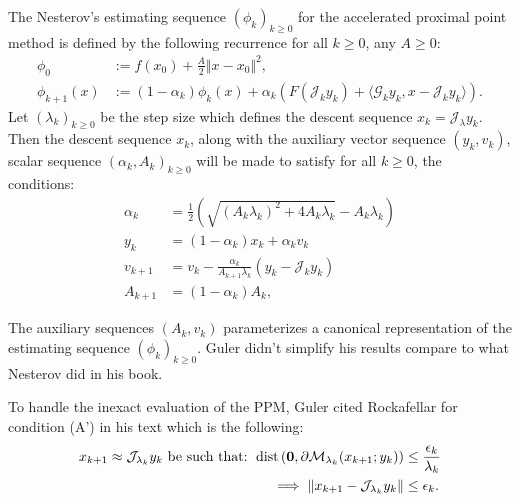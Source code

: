 \documentclass[12pt]{article}
\begin{document}
    \begin{definition}\label{def:nes-est-seq-acc-ppm}
        The Nesterov's estimating sequence $(\phi_k)_{k \ge0}$ for the accelerated proximal point method is defined by the following recurrence for all $k \ge0$, any $A \ge 0$: 
        \begin{align*}
            \phi_0 &:= f(x_0) + \frac{A}{2}\Vert x - x_0\Vert^2, 
            \\
            \phi_{k + 1}(x) &:= 
            (1 - \alpha_k)\phi_k(x)
            + 
            \alpha_k(F(\mathcal J_k y_k) + \langle \mathcal G_k y_k, x - \mathcal J_k y_k\rangle).    
        \end{align*}
        Let $(\lambda_k)_{k \ge 0}$ be the step size which defines the descent sequence $x_k = \mathcal J_\lambda y_k$. 
        Then the descent sequence $x_k$, along with the auxiliary vector sequence $(y_k, v_k)$, scalar sequence $(\alpha_k, A_k)_{k\ge 0}$ will be made to satisfy for all $k\ge0$, the conditions: 
        \begin{align*}
            \alpha_k &= \frac{1}{2}\left(
                \sqrt{(A_k\lambda_k)^2 + 4A_k \lambda_k}
                - A_k\lambda_k
            \right) 
            \\
            y_k &= (1 - \alpha_k)x_k + \alpha_k v_k
            \\
            v_{k + 1}
            &= 
            v_k - \frac{\alpha_k}{A_{k + 1}\lambda_k}(y_k - \mathcal J_k y_k)
            \\
            A_{k + 1} &= (1 - \alpha_k)A_k, 
        \end{align*}
    \end{definition}
    \begin{remark}
        The auxiliary sequences $(A_k, v_k)$ parameterizes a canonical representation of the estimating sequence $(\phi_k)_{k \ge0}$. 
        Guler didn't simplify his results compare to what Nesterov did in his book. 
    \end{remark}
    To handle the inexact evaluation of the PPM, Guler cited Rockafellar \cite{rockafellar_monotone_1976} for condition (A') in his text which is the following: 
    \begin{align*}
        x_{k + 1}\approx \mathcal J_{\lambda_k} y_k \text{ be such that: }
        \operatorname{dist}\left(
            \mathbf 0, \partial \mathcal M_{\lambda_k}(x_{k + 1}; y_k)
        \right) &\le \frac{\epsilon_k}{\lambda_k}
        \\
        \implies 
        \Vert x_{k + 1} - \mathcal J_{\lambda_k}y_k\Vert 
        &\le \epsilon_k. 
    \end{align*}
\end{document}
